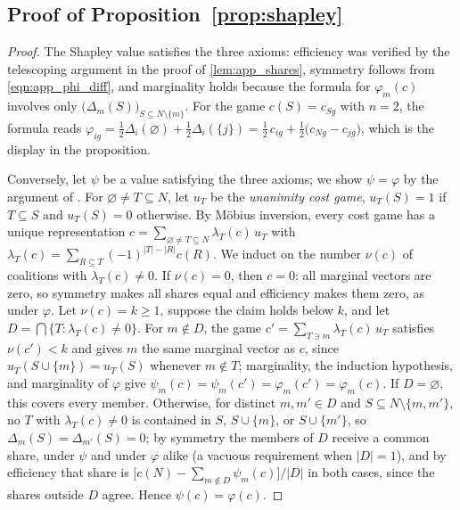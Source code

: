 \documentclass[11 pt]{article}
\begin{document}
\subsection{Proof of Proposition~\ref{prop:shapley}}\label{subsec:app_shapley}

\begin{proof}
The Shapley value satisfies the three axioms: efficiency was verified by the telescoping argument in the proof of \autoref{lem:app_shares}, symmetry follows from \eqref{eqn:app_phi_diff}, and marginality holds because the formula for $\varphi_{m}(c)$ involves only $\bigl( \Delta_{m}(S) \bigr)_{S \subseteq N \setminus \{m\}}$. For the game $c(S) = c_{Sg}$ with $n = 2$, the formula reads $\varphi_{ig} = \tfrac{1}{2} \Delta_{i}(\varnothing) + \tfrac{1}{2} \Delta_{i}(\{j\}) = \tfrac{1}{2}\, c_{ig} + \tfrac{1}{2} \bigl( c_{Ng} - c_{jg} \bigr)$, which is the display in the proposition.

Conversely, let $\psi$ be a value satisfying the three axioms; we show $\psi = \varphi$ by the argument of \citet{young1985monotonic}. For $\varnothing \neq T \subseteq N$, let $u_{T}$ be the \emph{unanimity cost game}, $u_{T}(S) = 1$ if $T \subseteq S$ and $u_{T}(S) = 0$ otherwise. By M\"{o}bius inversion, every cost game has a unique representation $c = \sum_{\varnothing \neq T \subseteq N} \lambda_{T}(c)\, u_{T}$ with $\lambda_{T}(c) = \sum_{R \subseteq T} (-1)^{|T|-|R|} c(R)$. We induct on the number $\nu(c)$ of coalitions with $\lambda_{T}(c) \neq 0$. If $\nu(c) = 0$, then $c = 0$: all marginal vectors are zero, so symmetry makes all shares equal and efficiency makes them zero, as under $\varphi$. Let $\nu(c) = k \geq 1$, suppose the claim holds below $k$, and let $D = \bigcap \{ T : \lambda_{T}(c) \neq 0 \}$. For $m \notin D$, the game $c' = \sum_{T \ni m} \lambda_{T}(c)\, u_{T}$ satisfies $\nu(c') < k$ and gives $m$ the same marginal vector as $c$, since $u_{T}(S \cup \{m\}) = u_{T}(S)$ whenever $m \notin T$; marginality, the induction hypothesis, and marginality of $\varphi$ give $\psi_{m}(c) = \psi_{m}(c') = \varphi_{m}(c') = \varphi_{m}(c)$. If $D = \varnothing$, this covers every member. Otherwise, for distinct $m, m' \in D$ and $S \subseteq N \setminus \{m,m'\}$, no $T$ with $\lambda_{T}(c) \neq 0$ is contained in $S$, $S \cup \{m\}$, or $S \cup \{m'\}$, so $\Delta_{m}(S) = \Delta_{m'}(S) = 0$; by symmetry the members of $D$ receive a common share, under $\psi$ and under $\varphi$ alike (a vacuous requirement when $|D| = 1$), and by efficiency that share is $\bigl[ c(N) - \sum_{m \notin D} \psi_{m}(c) \bigr] / |D|$ in both cases, since the shares outside $D$ agree. Hence $\psi(c) = \varphi(c)$.
\end{proof}
\end{document}
